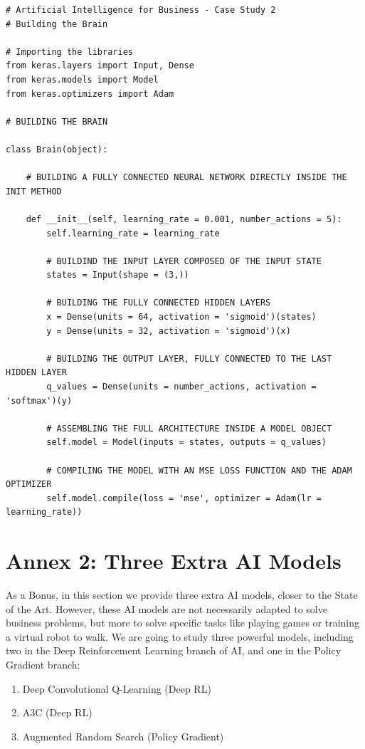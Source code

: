 \documentclass[]{book}
\begin{document}
\begin{lstlisting}
# Artificial Intelligence for Business - Case Study 2
# Building the Brain

# Importing the libraries
from keras.layers import Input, Dense
from keras.models import Model
from keras.optimizers import Adam

# BUILDING THE BRAIN

class Brain(object):
    
    # BUILDING A FULLY CONNECTED NEURAL NETWORK DIRECTLY INSIDE THE INIT METHOD
    
    def __init__(self, learning_rate = 0.001, number_actions = 5):
        self.learning_rate = learning_rate
        
        # BUILDIND THE INPUT LAYER COMPOSED OF THE INPUT STATE
        states = Input(shape = (3,))
        
        # BUILDING THE FULLY CONNECTED HIDDEN LAYERS
        x = Dense(units = 64, activation = 'sigmoid')(states)
        y = Dense(units = 32, activation = 'sigmoid')(x)
        
        # BUILDING THE OUTPUT LAYER, FULLY CONNECTED TO THE LAST HIDDEN LAYER
        q_values = Dense(units = number_actions, activation = 'softmax')(y)
        
        # ASSEMBLING THE FULL ARCHITECTURE INSIDE A MODEL OBJECT
        self.model = Model(inputs = states, outputs = q_values)
        
        # COMPILING THE MODEL WITH AN MSE LOSS FUNCTION AND THE ADAM OPTIMIZER
        self.model.compile(loss = 'mse', optimizer = Adam(lr = learning_rate))
\end{lstlisting}

\newpage

\hypertarget{annex-2-three-extra-ai-models}{%
\chapter{Annex 2: Three Extra AI Models}\label{annex-2-three-extra-ai-models}}

As a Bonus, in this section we provide three extra AI models, closer to the State of the Art. However, these AI models are not necessarily adapted to solve business problems, but more to solve specific tasks like playing games or training a virtual robot to walk. We are going to study three powerful models, including two in the Deep Reinforcement Learning branch of AI, and one in the Policy Gradient branch:

\begin{enumerate}
    \item Deep Convolutional Q-Learning (Deep RL)
    \item A3C (Deep RL)
    \item Augmented Random Search (Policy Gradient)
\end{enumerate}
\end{document}
